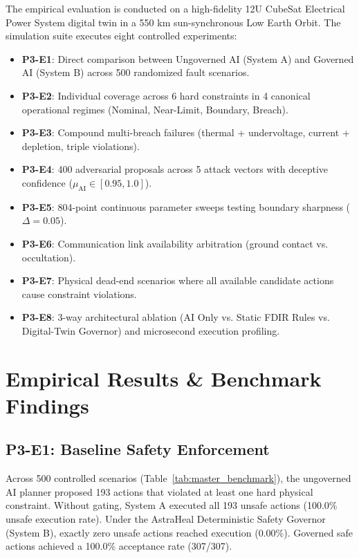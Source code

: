 \documentclass[conference]{IEEEtran}
\begin{document}
The empirical evaluation is conducted on a high-fidelity 12U CubeSat Electrical Power System digital twin in a 550 km sun-synchronous Low Earth Orbit. The simulation suite executes eight controlled experiments:
\begin{itemize}
    \item \textbf{P3-E1}: Direct comparison between Ungoverned AI (System A) and Governed AI (System B) across 500 randomized fault scenarios.
    \item \textbf{P3-E2}: Individual coverage across 6 hard constraints in 4 canonical operational regimes (Nominal, Near-Limit, Boundary, Breach).
    \item \textbf{P3-E3}: Compound multi-breach failures (thermal + undervoltage, current + depletion, triple violations).
    \item \textbf{P3-E4}: 400 adversarial proposals across 5 attack vectors with deceptive confidence ($\mu_{\text{AI}} \in [0.95, 1.0]$).
    \item \textbf{P3-E5}: 804-point continuous parameter sweeps testing boundary sharpness ($\Delta = 0.05$).
    \item \textbf{P3-E6}: Communication link availability arbitration (ground contact vs. occultation).
    \item \textbf{P3-E7}: Physical dead-end scenarios where all available candidate actions cause constraint violations.
    \item \textbf{P3-E8}: 3-way architectural ablation (AI Only vs. Static FDIR Rules vs. Digital-Twin Governor) and microsecond execution profiling.
\end{itemize}

\section{Empirical Results \& Benchmark Findings}

\subsection{P3-E1: Baseline Safety Enforcement}
Across 500 controlled scenarios (Table~\ref{tab:master_benchmark}), the ungoverned AI planner proposed 193 actions that violated at least one hard physical constraint. Without gating, System A executed all 193 unsafe actions (100.0\% unsafe execution rate). Under the AstraHeal Deterministic Safety Governor (System B), exactly zero unsafe actions reached execution ($0.00\%$). Governed safe actions achieved a 100.0\% acceptance rate (307/307). 
\end{document}
